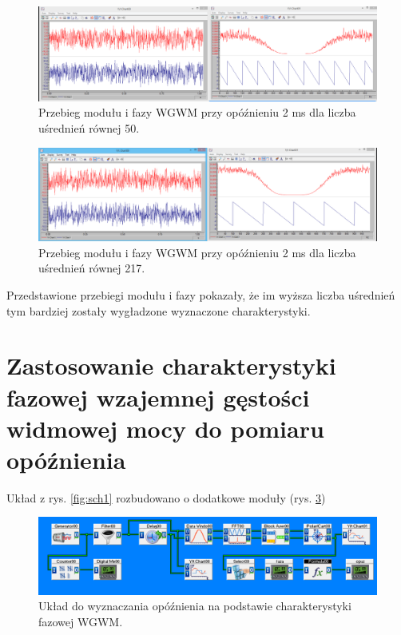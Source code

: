 \documentclass{classrep}
\begin{document}
\begin{figure}[H]
	\centering
	\includegraphics[width=1\linewidth]{wyk2}
	\caption{Przebieg modułu i fazy WGWM przy opóźnieniu 2 ms dla liczba uśrednień równej 50.}
	\label{fig:wyk2}
\end{figure}

\begin{figure}[H]
	\centering
	\includegraphics[width=1\linewidth]{wyk3}
	\caption{Przebieg modułu i fazy WGWM przy opóźnieniu 2 ms dla liczba uśrednień równej 217.}
	\label{fig:wyk3}
\end{figure}
\quad Przedstawione przebiegi modułu i fazy pokazały, że im wyższa liczba uśrednień tym bardziej zostały wygładzone wyznaczone charakterystyki.


\section{Zastosowanie charakterystyki fazowej wzajemnej gęstości widmowej mocy do
	pomiaru opóźnienia}

\quad Układ z rys. \ref{fig:sch1}  rozbudowano o dodatkowe moduły (rys. \ref{fig:sch2})

\begin{figure}[H]
	\centering
	\includegraphics[width=0.8\linewidth]{sch2}
	\caption{Układ do wyznaczania opóźnienia na podstawie charakterystyki fazowej WGWM.}
	\label{fig:sch2}
\end{figure}
\end{document}
